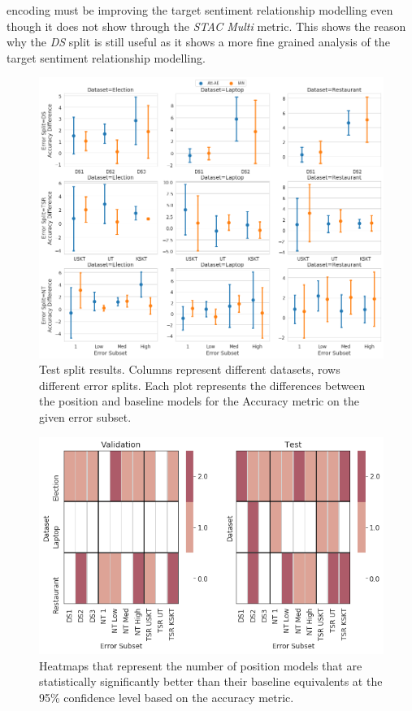 encoding must be improving the target sentiment relationship modelling even though it does not show through the \textit{STAC Multi} metric. This shows the reason why the \textit{DS} split is still useful as it shows a more fine grained analysis of the target sentiment relationship modelling. 

\begin{figure}[h!]
    \centering
    \includegraphics[scale=0.4]{images/augmentation/methods_performance/Position_Encoding/position_split_difference_test_results.png}
    \caption{Test split results. Columns represent different datasets, rows different error splits. Each plot represents the differences between the position and baseline models for the Accuracy metric on the given error subset.}
    \label{fig:aug_position_split_difference_test_results}
\end{figure}

\begin{figure}[h!]
    \centering
    \includegraphics[scale=0.6]{images/augmentation/methods_performance/Position_Encoding/position_dataset_subset_heatmap.png}
    \caption{Heatmaps that represent the number of position models that are statistically significantly better than their baseline equivalents at the 95\% confidence level based on the accuracy metric.}
    \label{fig:aug_position_dataset_subset_heatmap}
\end{figure}

